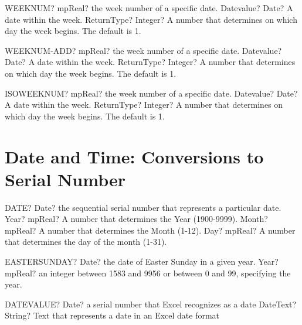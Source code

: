 \documentclass[12pt,a4paper,openany]{book}
\begin{document}
\begin{mpFunctionsExtract}
\mpWorksheetFunctionTwoNotImplemented
{WEEKNUM? mpReal? the week number of a specific date.}
{Datevalue? Date? A date within the week. }
{ReturnType? Integer? A number that determines on which day the week begins. The default is 1.}
\end{mpFunctionsExtract}

\begin{mpFunctionsExtract}
\mpWorksheetFunctionTwoNotImplemented
{WEEKNUM-ADD? mpReal? the week number of a specific date.}
{Datevalue? Date? A date within the week. }
{ReturnType? Integer? A number that determines on which day the week begins. The default is 1.}
\end{mpFunctionsExtract}

\begin{mpFunctionsExtract}
\mpWorksheetFunctionTwoNotImplemented
{ISOWEEKNUM? mpReal? the week number of a specific date.}
{Datevalue? Date? A date within the week. }
{ReturnType? Integer? A number that determines on which day the week begins. The default is 1.}
\end{mpFunctionsExtract}

\section{Date and Time: Conversions to Serial Number}

\begin{mpFunctionsExtract}
\mpWorksheetFunctionThreeNotImplemented
{DATE? Date? the sequential serial number that represents a particular date.}
{Year? mpReal? A number that determines the Year (1900-9999).}
{Month? mpReal? A number that determines the Month (1-12).}
{Day? mpReal? A number that determines the day of the month (1-31).}
\end{mpFunctionsExtract}

\begin{mpFunctionsExtract}
\mpWorksheetFunctionOneNotImplemented
{EASTERSUNDAY? Date? the date of Easter Sunday in a given year.}
{Year? mpReal? an integer between 1583 and 9956 or between 0 and 99, specifying the year. }
\end{mpFunctionsExtract}

\begin{mpFunctionsExtract}
\mpWorksheetFunctionOneNotImplemented
{DATEVALUE? Date? a serial number that Excel recognizes as a date}
{DateText? String? Text that represents a date in an Excel date format}
\end{mpFunctionsExtract}
\end{document}
